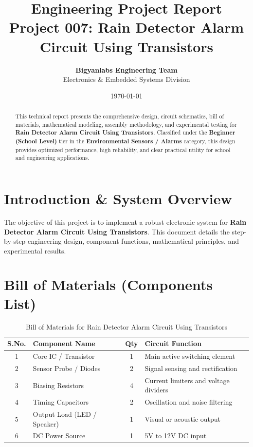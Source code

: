 \documentclass[11pt,a4paper]{article}
\title{\textbf{\Huge Engineering Project Report}\\[0.5em] \Large Project 007: Rain Detector Alarm Circuit Using Transistors}
\author{\textbf{Bigyanlabs Engineering Team}\\ Electronics \& Embedded Systems Division}
\date{\today}
\begin{document}
\maketitle
\thispagestyle{empty}

\begin{abstract}
This technical report presents the comprehensive design, circuit schematics, bill of materials, mathematical modeling, assembly methodology, and experimental testing for \textbf{Rain Detector Alarm Circuit Using Transistors}. Classified under the \textbf{Beginner (School Level)} tier in the \textbf{Environmental Sensors / Alarms} category, this design provides optimized performance, high reliability, and clear practical utility for school and engineering applications.
\end{abstract}

\newpage
\tableofcontents
\newpage

\section{Introduction \& System Overview}
The objective of this project is to implement a robust electronic system for \textbf{Rain Detector Alarm Circuit Using Transistors}. This document details the step-by-step engineering design, component functions, mathematical principles, and experimental results.

\section{Bill of Materials (Components List)}
\begin{table}[h!]
\centering
\caption{Bill of Materials for Rain Detector Alarm Circuit Using Transistors}
\vspace{0.5em}
\begin{tabular}{clcp{7cm}}
\toprule
\textbf{S.No.} & \textbf{Component Name} & \textbf{Qty} & \textbf{Circuit Function} \\
\midrule
1 & Core IC / Transistor & 1 & Main active switching element \\
2 & Sensor Probe / Diodes & 2 & Signal sensing and rectification \\
3 & Biasing Resistors & 4 & Current limiters and voltage dividers \\
4 & Timing Capacitors & 2 & Oscillation and noise filtering \\
5 & Output Load (LED / Speaker) & 1 & Visual or acoustic output \\
6 & DC Power Source & 1 & 5V to 12V DC input \\
\bottomrule
\end{tabular}
\end{table}
\end{document}
